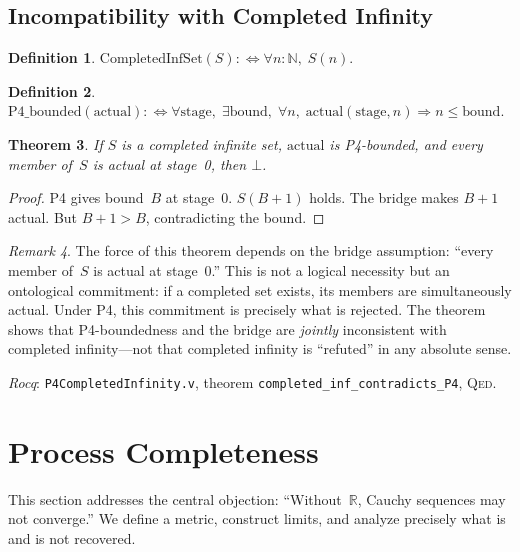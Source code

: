 \documentclass[11pt,a4paper]{article}
\newtheorem{theorem}{Theorem}[section]
\theoremstyle{definition}
\newtheorem{definition}[theorem]{Definition}
\theoremstyle{remark}
\newtheorem{remark}[theorem]{Remark}
\newcommand{\Qed}{\textsc{Qed}}
\begin{document}
\subsection{Incompatibility with Completed Infinity}

\begin{definition}
$\mathrm{CompletedInfSet}(S) :\Leftrightarrow \forall n : \mathbb{N},\; S(n)$.
\end{definition}

\begin{definition}
$\mathrm{P4\_bounded}(\mathrm{actual}) :\Leftrightarrow \forall \text{stage},\; \exists \text{bound},\; \forall n,\; \mathrm{actual}(\text{stage}, n) \Rightarrow n \le \text{bound}$.
\end{definition}

\begin{theorem}\label{thm:p4prohibit}
If $S$ is a completed infinite set, $\mathrm{actual}$ is P4-bounded, and every member of~$S$ is actual at stage~0, then $\bot$.
\end{theorem}

\begin{proof}
P4 gives bound~$B$ at stage~0.  $S(B{+}1)$ holds.  The bridge makes $B{+}1$ actual.  But $B{+}1 > B$, contradicting the bound.
\end{proof}

\begin{remark}
The force of this theorem depends on the bridge assumption: ``every member of~$S$ is actual at stage~0.''  This is not a logical necessity but an ontological commitment: if a completed set exists, its members are simultaneously actual.  Under P4, this commitment is precisely what is rejected.  The theorem shows that P4-boundedness and the bridge are \emph{jointly} inconsistent with completed infinity---not that completed infinity is ``refuted'' in any absolute sense.
\end{remark}

\emph{Rocq}: \texttt{P4CompletedInfinity.v}, theorem \texttt{completed\_inf\_contradicts\_P4}, \Qed.


\section{Process Completeness}
\label{sec:completeness}

This section addresses the central objection: ``Without~$\mathbb{R}$, Cauchy sequences may not converge.''  We define a metric, construct limits, and analyze precisely what is and is not recovered.
\end{document}
